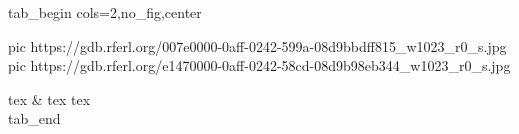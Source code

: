  
 
 
 
 

\ifcmt
  tab_begin cols=2,no_fig,center

     pic https://gdb.rferl.org/007e0000-0aff-0242-599a-08d9bbdff815_w1023_r0_s.jpg
		 pic https://gdb.rferl.org/e1470000-0aff-0242-58cd-08d9b98eb344_w1023_r0_s.jpg

		 tex  &
		 tex  
		 tex \\

  tab_end
\fi
